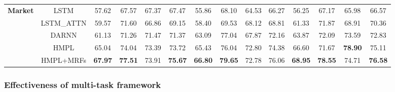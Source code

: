 \documentclass[sigconf]{acmart}
\begin{document}
\begin{table}[t]
\begin{tabular}{@{}cccccccccccccc@{}}
\multirow{5}{*}{\textbf{Market}}    & LSTM                            & 57.62                      & 67.57          & 67.37          & 67.47                      & 55.86          & 68.10          & 64.53          & 66.27                               & 56.25          & 67.17          & 65.98          & 66.57          \\
                           & \multicolumn{1}{c|}{LSTM\_ATTN} & 59.57                      & 71.60          & 66.86          & \multicolumn{1}{c|}{69.15} & 58.40          & 69.53          & 68.12          & \multicolumn{1}{c|}{68.81}          & 61.33          & 71.87          & 68.91          & 70.36          \\
                           & \multicolumn{1}{c|}{DARNN}      & 61.13                      & 71.26          & 71.47          & \multicolumn{1}{c|}{71.37} & 63.09          & 77.04          & 67.87          & \multicolumn{1}{c|}{72.16}          & 63.87          & 72.09          & 73.59          & 72.83          \\
                           & \multicolumn{1}{c|}{HMPL}       & 65.04                      & 74.04          & 73.39          & \multicolumn{1}{c|}{73.72} & 65.43          & 76.04          & 72.80 & \multicolumn{1}{c|}{74.38} & 66.60          & 71.67          & \textbf{78.90} & 75.11          \\
                           & HMPL+MRFs                       & \textbf{67.97}             & \textbf{77.51} & 73.91          & \textbf{75.67}             & \textbf{66.80} & \textbf{79.65} & 72.78          & 76.06                               & \textbf{68.95} & \textbf{78.55} & 74.71          & \textbf{76.58} \\ \bottomrule
\end{tabular}
\label{tab:result}
\end{table}

\subsubsection{Effectiveness of multi-task framework}
\end{document}
